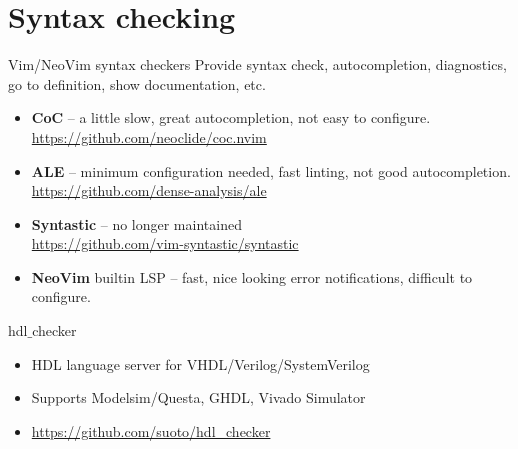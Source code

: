 \documentclass[aspectratio=169]{beamer}
\newcommand{\myurl}[1]{{\color{indigo}\url{#1}}}%
\begin{document}
\section*{Syntax checking}
\begin{frame}{\secname}

  \begin{block}{Vim/NeoVim syntax checkers}
    Provide syntax check, autocompletion, diagnostics, go to definition, show documentation, etc.
  \begin{itemize}
    \item \textbf{CoC} -- a little slow, great autocompletion, not easy to configure.
      \\ \myurl{https://github.com/neoclide/coc.nvim} 
    \item \textbf{ALE} -- minimum configuration needed, fast linting, not good autocompletion.
      \\ \myurl{https://github.com/dense-analysis/ale}
    \item \textbf{Syntastic} -- no longer maintained
      \\ \myurl{https://github.com/vim-syntastic/syntastic}
    \item \textbf{NeoVim} builtin LSP -- fast, nice looking error notifications, difficult to configure.
  \end{itemize}
  \end{block}

  \begin{block}{hdl$\_$checker}
    \begin{itemize}
     \item HDL language server  for VHDL/Verilog/SystemVerilog
     \item Supports Modelsim/Questa, GHDL, Vivado Simulator
     \item \myurl{https://github.com/suoto/hdl_checker}
    \end{itemize}
    
  \end{block}
    
\end{frame}

\end{document}
